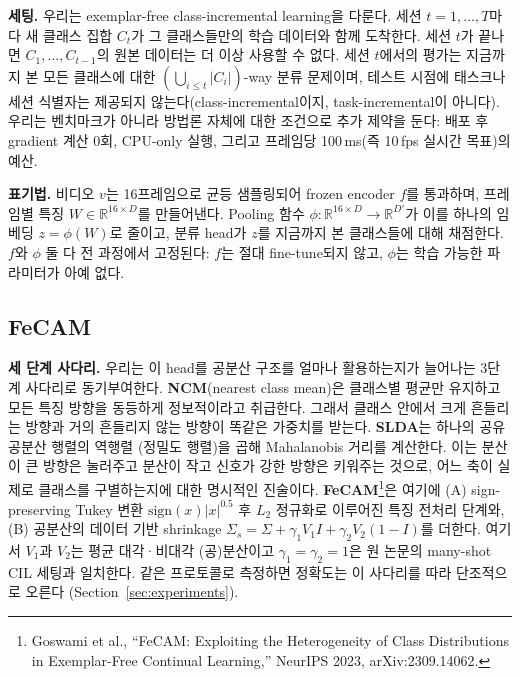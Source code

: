\documentclass[11pt]{article}
\begin{document}
\textbf{세팅.} 우리는 exemplar-free class-incremental learning을 다룬다. 세션
$t = 1,\ldots,T$마다 새 클래스 집합 $C_t$가 그 클래스들만의 학습 데이터와
함께 도착한다. 세션 $t$가 끝나면 $C_1,\ldots,C_{t-1}$의 원본 데이터는 더
이상 사용할 수 없다. 세션 $t$에서의 평가는 지금까지 본 모든 클래스에 대한
$\left(\bigcup_{i \le t} |C_i|\right)$-way 분류 문제이며, 테스트 시점에
태스크나 세션 식별자는 제공되지 않는다(class-incremental이지,
task-incremental이 아니다). 우리는 벤치마크가 아니라 방법론 자체에 대한
조건으로 추가 제약을 둔다: 배포 후 gradient 계산 0회, CPU-only 실행,
그리고 프레임당 100\,ms(즉 10\,fps 실시간 목표)의 예산.

\textbf{표기법.} 비디오 $v$는 16프레임으로 균등 샘플링되어 frozen encoder
$f$를 통과하며, 프레임별 특징 $W \in \mathbb{R}^{16 \times D}$를 만들어낸다.
Pooling 함수 $\phi : \mathbb{R}^{16 \times D} \to \mathbb{R}^{D'}$가 이를
하나의 임베딩 $z = \phi(W)$로 줄이고, 분류 head가 $z$를 지금까지 본
클래스들에 대해 채점한다. $f$와 $\phi$ 둘 다 전 과정에서 고정된다: $f$는
절대 fine-tune되지 않고, $\phi$는 학습 가능한 파라미터가 아예 없다.

\subsection{FeCAM}
\label{sec:method-fecam}

\textbf{세 단계 사다리.} 우리는 이 head를 공분산 구조를 얼마나 활용하는지가 늘어나는 3단계
사다리로 동기부여한다. \textbf{NCM}(nearest class mean)은 클래스별
평균만 유지하고 모든 특징 방향을 동등하게 정보적이라고 취급한다. 그래서
클래스 안에서 크게 흔들리는 방향과 거의 흔들리지 않는 방향이 똑같은
가중치를 받는다. \textbf{SLDA}는 하나의 공유 공분산 행렬의 역행렬
(정밀도 행렬)을 곱해 Mahalanobis 거리를 계산한다. 이는 분산이 큰 방향은
눌러주고 분산이 작고 신호가 강한 방향은 키워주는 것으로, 어느 축이 실제로
클래스를 구별하는지에 대한 명시적인 진술이다.
\textbf{FeCAM}\footnote{Goswami et al., ``FeCAM: Exploiting the
Heterogeneity of Class Distributions in Exemplar-Free Continual
Learning,'' NeurIPS 2023, arXiv:2309.14062.}은 여기에 (A)
sign-preserving Tukey 변환 $\mathrm{sign}(x)|x|^{0.5}$ 후 $L_2$ 정규화로
이루어진 특징 전처리 단계와, (B) 공분산의 데이터 기반 shrinkage
$\Sigma_s = \Sigma + \gamma_1 V_1 I + \gamma_2 V_2 (1-I)$를 더한다.
여기서 $V_1$과 $V_2$는 평균 대각·비대각 (공)분산이고
$\gamma_1=\gamma_2=1$은 원 논문의 many-shot CIL 세팅과 일치한다. 같은
프로토콜로 측정하면 정확도는 이 사다리를 따라 단조적으로 오른다
(Section~\ref{sec:experiments}).
\end{document}
